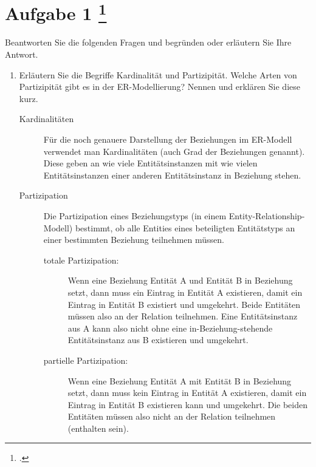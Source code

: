 \documentclass{lehramt-informatik-aufgabe}
\begin{document}
\section{Aufgabe 1
\footcite{66116:2021:03}}

Beantworten Sie die folgenden Fragen und begründen oder erläutern Sie
Ihre Antwort.

\begin{enumerate}


\item Erläutern Sie die Begriffe Kardinalität und Partizipität. Welche
Arten von Partizipität gibt es in der ER-Modellierung? Nennen und
erklären Sie diese kurz.

\begin{liAntwort}
\begin{description}
\item[Kardinalitäten]

Für die noch genauere Darstellung der Beziehungen im ER-Modell verwendet
man Kardinalitäten (auch Grad der Beziehungen genannt). Diese geben an
wie viele Entitätsinstanzen mit wie vielen Entitätsinstanzen einer
anderen Entitätsinstanz in Beziehung stehen.

\item[Partizipation]

Die Partizipation eines Beziehungstyps (in einem
Entity-Relationship-Modell) bestimmt, ob alle Entities eines beteiligten
Entitätstyps an einer bestimmten Beziehung teilnehmen müssen.

\begin{description}
\item[totale Partizipation:]

Wenn eine Beziehung Entität A und Entität B in Beziehung setzt, dann
muss ein Eintrag in Entität A existieren, damit ein Eintrag in Entität B
existiert und umgekehrt. Beide Entitäten müssen also an der Relation
teilnehmen. Eine Entitätsinstanz aus A kann also nicht ohne eine
in-Beziehung-stehende Entitätsinstanz aus B existieren und umgekehrt.

\item[partielle Partizipation:]

Wenn eine Beziehung Entität A mit Entität B in Beziehung setzt, dann
muss kein Eintrag in Entität A existieren, damit ein Eintrag in  Entität
B existieren kann und umgekehrt. Die beiden Entitäten müssen also nicht
an der Relation teilnehmen (enthalten sein).
\end{description}
\end{description}
\end{liAntwort}


\end{enumerate}
\end{document}
